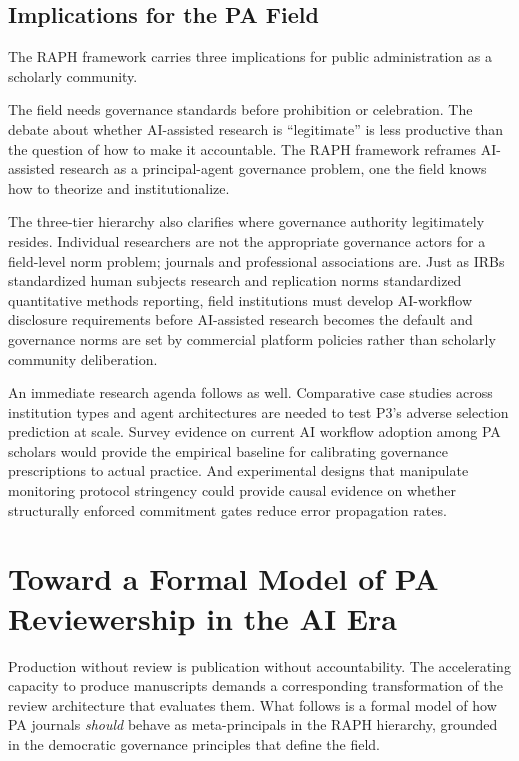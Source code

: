 \documentclass[12pt]{article}
\begin{document}
\subsection{Implications for the PA Field}

The RAPH framework carries three implications for public administration as a scholarly
community.

The field needs governance standards before prohibition or celebration. The debate about
whether AI-assisted research is ``legitimate'' is less productive than the question of how
to make it accountable. The RAPH framework reframes AI-assisted research as a
principal-agent governance problem, one the field knows how to theorize and institutionalize.

The three-tier hierarchy also clarifies where governance authority legitimately resides.
Individual researchers are not the appropriate governance actors for a field-level norm
problem; journals and professional associations are. Just as IRBs standardized human subjects
research and replication norms standardized quantitative methods reporting, field institutions
must develop AI-workflow disclosure requirements before AI-assisted research becomes the
default and governance norms are set by commercial platform policies rather than scholarly
community deliberation.

An immediate research agenda follows as well. Comparative case studies across institution
types and agent architectures are needed to test P3's adverse selection prediction at scale.
Survey evidence on current AI workflow adoption among PA scholars would provide the empirical
baseline for calibrating governance prescriptions to actual practice. And experimental designs
that manipulate monitoring protocol stringency could provide causal evidence on whether
structurally enforced commitment gates reduce error propagation rates.

\section{Toward a Formal Model of PA Reviewership in the AI Era}

Production without review is publication without accountability. The accelerating capacity
to produce manuscripts demands a corresponding transformation of the review architecture
that evaluates them. What follows is a formal model of how PA journals \emph{should} behave
as meta-principals in the RAPH hierarchy, grounded in the democratic governance principles
that define the field.
\end{document}
